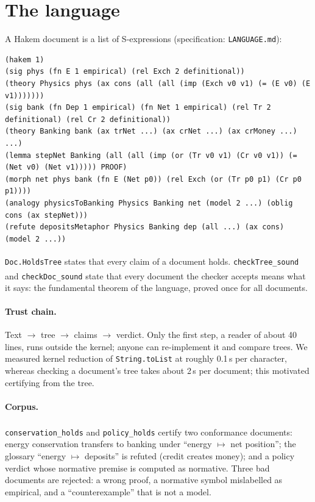\documentclass[11pt]{article}
\newcommand{\thm}[1]{\texttt{#1}}
\newcommand{\ok}{\textsuperscript{\checkmark}}
\begin{document}
\section{The language}

A Hakem document is a list of S-expressions (specification: \texttt{LANGUAGE.md}):
\begin{lstlisting}
(hakem 1)
(sig phys (fn E 1 empirical) (rel Exch 2 definitional))
(theory Physics phys (ax cons (all (all (imp (Exch v0 v1) (= (E v0) (E v1)))))))
(sig bank (fn Dep 1 empirical) (fn Net 1 empirical) (rel Tr 2 definitional) (rel Cr 2 definitional))
(theory Banking bank (ax trNet ...) (ax crNet ...) (ax crMoney ...) ...)
(lemma stepNet Banking (all (all (imp (or (Tr v0 v1) (Cr v0 v1)) (= (Net v0) (Net v1))))) PROOF)
(morph net phys bank (fn E (Net p0)) (rel Exch (or (Tr p0 p1) (Cr p0 p1))))
(analogy physicsToBanking Physics Banking net (model 2 ...) (oblig cons (ax stepNet)))
(refute depositsMetaphor Physics Banking dep (all ...) (ax cons) (model 2 ...))
\end{lstlisting}
\texttt{Doc.HoldsTree} states that every claim of a document holds.
\thm{checkTree\_sound}\ok{} and \thm{checkDoc\_sound}\ok{} state that every document the
checker accepts means what it says: the fundamental theorem of the language, proved once for
all documents.

\paragraph{Trust chain.}
Text $\to$ tree $\to$ claims $\to$ verdict. Only the first step, a reader of about 40 lines,
runs outside the kernel; anyone can re-implement it and compare trees. We measured kernel
reduction of \texttt{String.toList} at roughly 0.1\,s per character, whereas checking a
document's tree takes about 2\,s per document; this motivated certifying from the tree.

\paragraph{Corpus.}
\thm{conservation\_holds}\ok{} and \thm{policy\_holds}\ok{} certify two conformance documents:
energy conservation transfers to banking under ``energy $\mapsto$ net position''; the glossary
``energy $\mapsto$ deposits'' is refuted (credit creates money); and a policy verdict whose
normative premise is computed as normative. Three bad documents are rejected: a wrong proof,
a normative symbol mislabelled as empirical, and a ``counterexample'' that is not a model.
\end{document}
